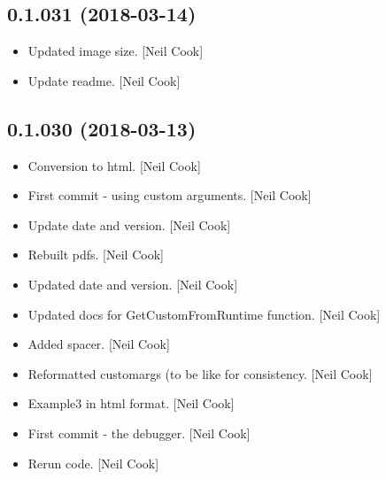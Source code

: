 \documentclass[a4paper,10pt,english]{report}
\begin{document}
\subsection{0.1.031 (2018-03-14)}
\label{\detokenize{misc/changelog:id473}}\begin{itemize}
\item {} 
Updated image size. {[}Neil Cook{]}

\item {} 
Update readme. {[}Neil Cook{]}

\end{itemize}


\subsection{0.1.030 (2018-03-13)}
\label{\detokenize{misc/changelog:id474}}\begin{itemize}
\item {} 
Conversion to html. {[}Neil Cook{]}

\item {} 
First commit - using custom arguments. {[}Neil Cook{]}

\item {} 
Update date and version. {[}Neil Cook{]}

\item {} 
Rebuilt pdfs. {[}Neil Cook{]}

\item {} 
Updated date and version. {[}Neil Cook{]}

\item {} 
Updated docs for GetCustomFromRuntime function. {[}Neil Cook{]}

\item {} 
Added spacer. {[}Neil Cook{]}

\item {} 
Reformatted customargs (to be like  for consistency. {[}Neil
Cook{]}

\item {} 
Example3 in html format. {[}Neil Cook{]}

\item {} 
First commit - the debugger. {[}Neil Cook{]}

\item {} 
Rerun code. {[}Neil Cook{]}

\end{itemize}
\end{document}

